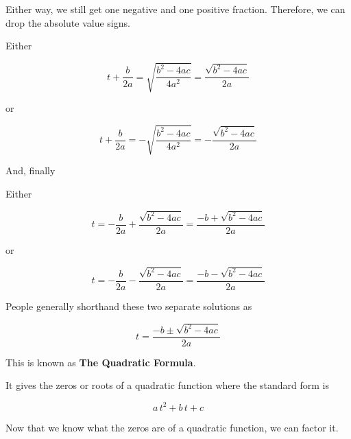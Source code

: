 \documentclass{ximera}
\begin{document}
Either way, we still get one negative and one positive fraction.  Therefore, we can drop the absolute value signs.  





Either 


\[ t + \frac{b}{2 a}  = \sqrt{\frac{b^2 - 4 a c}{4 a^2}}  = \frac{\sqrt{b^2 - 4 a c}}{2a}   \]

or


\[ t + \frac{b}{2 a}  = -\sqrt{\frac{b^2 - 4 a c}{4 a^2}} = -\frac{\sqrt{b^2 - 4 a c}}{2a}    \]










And, finally \\


\begin{conclusion}



Either 


\[ t   = - \frac{b}{2 a} + \frac{\sqrt{b^2 - 4 a c}}{2a}  = \frac{-b + \sqrt{b^2 - 4 a c}}{2a}      \]

or


\[ t  = - \frac{b}{2 a}  -\frac{\sqrt{b^2 - 4 a c}}{2a} =    \frac{-b - \sqrt{b^2 - 4 a c}}{2a}      \]

\end{conclusion}






People generally shorthand these two separate solutions as



\[ t  =   \frac{-b \pm \sqrt{b^2 - 4 a c}}{2a}      \]


This is known as \textbf{The Quadratic Formula}.


It gives the zeros or roots of a quadratic function where the standard form is 

\[
a \, t^2 + b \, t + c
\]



Now that we know what the zeros are of a quadratic function, we can factor it.
\end{document}

